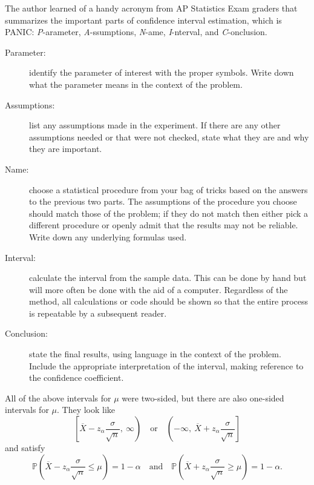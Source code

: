 The author learned of a handy acronym from AP Statistics Exam graders
that summarizes the important parts of confidence interval estimation,
which is PANIC: \emph{P}-arameter, \emph{A}-ssumptions, \emph{N}-ame, \emph{I}-nterval,
and \emph{C}-onclusion.
\begin{description}
\item[{Parameter:}] identify the parameter of interest with the proper
symbols. Write down what the parameter means in the
context of the problem.
\item[{Assumptions:}] list any assumptions made in the experiment. If
there are any other assumptions needed or that were
not checked, state what they are and why they are
important.
\item[{Name:}] choose a statistical procedure from your bag of tricks
based on the answers to the previous two parts. The
assumptions of the procedure you choose should match those
of the problem; if they do not match then either pick a
different procedure or openly admit that the results may
not be reliable. Write down any underlying formulas used.
\item[{Interval:}] calculate the interval from the sample data. This can
be done by hand but will more often be done with the
aid of a computer. Regardless of the method, all
calculations or code should be shown so that the entire
process is repeatable by a subsequent reader.
\item[{Conclusion:}] state the final results, using language in the
context of the problem. Include the appropriate
interpretation of the interval, making reference to
the confidence coefficient.
\end{description}

\begin{rem}
All of the above intervals for \(\mu\) were two-sided, but there are
also one-sided intervals for \(\mu\). They look like
\begin{equation}
\left[\overline{X}-z_{\alpha}\frac{\sigma}{\sqrt{n}},\ \infty\right)\quad \mbox{or}\quad \left(-\infty,\ \overline{X}+z_{\alpha}\frac{\sigma}{\sqrt{n}}\right]
\end{equation}
and satisfy
\begin{equation}
\mathbb{P}\left(\overline{X}-z_{\alpha}\frac{\sigma}{\sqrt{n}}\leq\mu\right)=1-\alpha\quad \mbox{and}\quad \mathbb{P}\left(\overline{X}+z_{\alpha}\frac{\sigma}{\sqrt{n}}\geq\mu\right)=1-\alpha.
\end{equation}
\end{rem}



